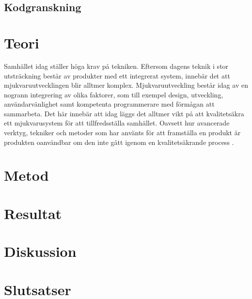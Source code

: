 \subsection{Kodgranskning}


\clearpage

\section{Teori}
\label{sec:theory-wallstrom}

Samhället idag ställer höga krav på tekniken. Eftersom dagens teknik i stor utsträckning består av produkter med ett integrerat system, innebär det att mjukvaruutvecklingen blir alltmer komplex. Mjukvaruutveckling består idag av en nogrann integrering av olika faktorer, som till exempel design, utveckling, användarvänlighet samt kompetenta programmerare med förmågan att sammarbeta. Det här innebär att idag läggs det alltmer vikt på att kvalitetsäkra ett mjukvarusystem för att tillfredsställa samhället. Oavsett hur avancerade verktyg, tekniker och metoder som har använts för att framställa en produkt är produkten oanvändbar om den inte gått igenom en kvalitetsäkrande process \cite{gill2005factors}.





\section{Metod}
\label{sec:method-wallstrom}


\section{Resultat}
\label{sec:results-wallstrom}


\section{Diskussion}
\label{sec:discussion-wallstrom}


\section{Slutsatser}
\label{sec:conclusions-wallstrom}


